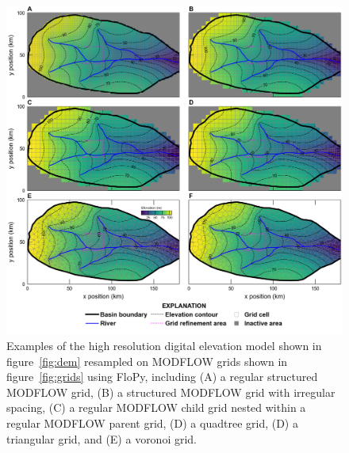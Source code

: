 \documentclass[11pt, oneside]{article}   	%
\begin{document}
\begin{figure}[ht!]
	\begin{center}
		\includegraphics{figures/grids_geoprocessing.png}
	\end{center}
	\caption{Examples of the high resolution digital elevation model shown in figure~\ref{fig:dem} resampled on MODFLOW grids shown in figure~\ref{fig:grids} using FloPy, including (A) a regular structured MODFLOW grid, (B) a structured MODFLOW grid with irregular spacing, (C) a regular MODFLOW child grid nested within a regular MODFLOW parent grid, (D) a quadtree grid, (D) a triangular grid, and (E) a voronoi grid.}
	\label{fig:geoprocessing}
\end{figure}
\end{document}
